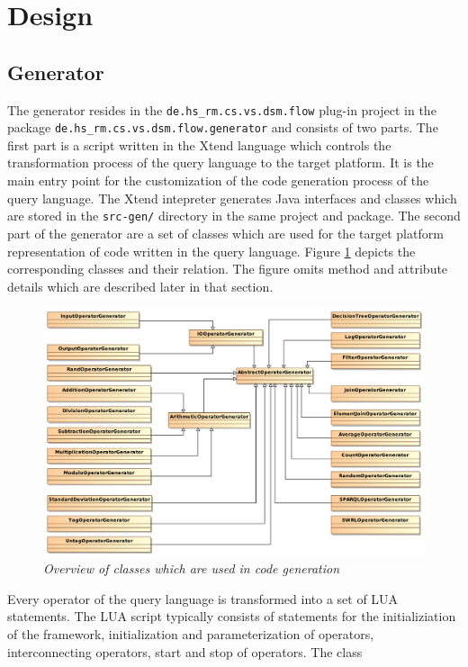 \section{Design}\label{chapter:design}
\subsection{Generator}
The generator resides in the \texttt{de.hs\_rm.cs.vs.dsm.flow} plug-in project 
in the package \texttt{de.hs\-\_rm.\-cs.vs.dsm.flow.generator} and consists of 
two parts. The first part is a script written in the Xtend \cite{xtend} language 
which controls the transformation process of the query language to the target 
platform. It is the main entry point for the customization of the code 
generation process of the query language. The Xtend intepreter generates 
Java interfaces and classes which are stored in the \texttt{src-gen/} directory
in the same project and package. The second part of the generator are a set of
classes which are used for the target platform representation of code written in
the query language. Figure \ref{fig:generator} depicts the corresponding classes
and their relation. The figure omits method and attribute details which are 
described later in that section.
\begin{figure}[htpb]
  \centering
  \includegraphics[width=1.0\textwidth]{figures/overview}
  \caption{\emph{Overview of classes which are used in code generation}}
  \label{fig:generator}
\end{figure}
Every operator of the query language is transformed into a set of LUA 
statements. The LUA script typically consists of statements for the 
initializiation of the framework, initialization and parameterization of 
operators, interconnecting operators, start and stop of operators. The class 
